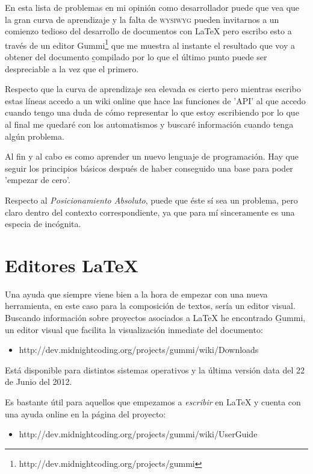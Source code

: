 \documentclass[11pt]{article}
\begin{document}
En esta lista de problemas en mi opini\'on como desarrollador puede que vea que la gran curva de aprendizaje y la falta de \textsc{wysiwyg} pueden invitarnos a un comienzo tedioso del desarrollo de documentos con \LaTeX{} pero escribo esto a trav\'es de un editor Gummi\footnote{http://dev.midnightcoding.org/projects/gummi} que me muestra al instante el resultado que voy a obtener del documento \b{compilado} por lo que el \'ultimo punto puede ser despreciable a la vez que el primero.

Respecto que la curva de aprendizaje sea elevada es cierto pero mientras escribo estas l\'ineas accedo a un wiki online que hace las funciones de 'API' al que accedo cuando tengo una duda de cómo representar lo que estoy escribiendo por lo que al final me quedar\'e con los automatismos y buscar\'e informaci\'on cuando tenga alg\'un problema.

Al fin y al cabo es como aprender un nuevo lenguaje de programaci\'on. Hay que seguir los principios b\'asicos despu\'es de haber conseguido una base para poder 'empezar de cero'.

Respecto al \emph{Posicionamiento Absoluto}, puede que éste s\'i sea un problema, pero claro dentro del contexto correspondiente, ya que para m\'i sinceramente es una especia de inc\'ognita.

\section{Editores \LaTeX{}}

Una ayuda que siempre viene bien a la hora de empezar con una nueva herramienta, en este caso para la composición de textos, sería un editor visual.
Buscando información sobre proyectos asociados a LaTeX he encontrado \b{Gummi}, un editor visual que facilita la visualización inmediate del documento:

\begin{itemize}
	\item http://dev.midnightcoding.org/projects/gummi/wiki/Downloads
\end{itemize}

Est\'a disponible para distintos sistemas operativos y la \'ultima versión data del 22 de Junio del 2012. 

Es bastante \'util para aquellos que empezamos a \emph{escribir} en \LaTeX{} y cuenta con una ayuda online en la página del proyecto:

\begin{itemize}
	\item http://dev.midnightcoding.org/projects/gummi/wiki/UserGuide
\end{itemize}
\end{document}
